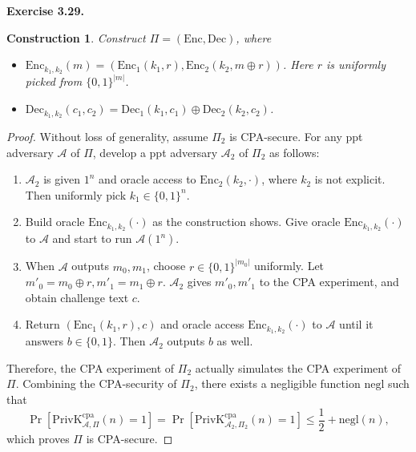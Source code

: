 \documentclass[a4paper]{article}
\newtheorem{construction}{Construction}
\newtheorem*{proof}{Proof}
\newenvironment{exercise}[1]{
	\par
	\noindent\textbf{Exercise #1.}\quad
}{
	\par
	\bigskip
}
\newcommand{\sbra}[1]{\left[ #1 \right]}
\newcommand{\bin}{\{0,1\}}
\newcommand{\Enc}{\mathrm{Enc}}
\newcommand{\Dec}{\mathrm{Dec}}
\newcommand{\PrivK}{\mathrm{PrivK}}
\newcommand{\negl}{\mathrm{negl}}
\newcommand{\ppt}{{\sc ppt} }
\newcommand{\cpa}{\mathrm{cpa}}
\begin{document}
\begin{exercise}{3.29}
\begin{construction}
    Construct $\Pi=(\Enc,\Dec)$, where
    \begin{itemize}
        \item $\Enc_{k_1,k_2}(m)=(\Enc_1(k_1,r),\Enc_2(k_2,m\oplus r))$. Here $r$ is uniformly picked from $\bin^{|m|}$.
        \item $\Dec_{k_1,k_2}(c_1,c_2)=\Dec_1(k_1,c_1)\oplus\Dec_2(k_2,c_2)$.
    \end{itemize}
\end{construction}
\begin{proof}
    Without loss of generality, assume $\Pi_2$ is CPA-secure. For any \ppt adversary $\mathcal A$ of $\Pi$, develop
    a \ppt adversary $\mathcal A_2$ of $\Pi_2$ as follows:
    \begin{enumerate}
        \item $\mathcal A_2$ is given $1^n$ and oracle access to $\Enc_2(k_2,\cdot)$, where $k_2$ is not explicit. 
            Then uniformly pick $k_1\in\{0,1\}^n$.
        \item Build oracle $\Enc_{k_1,k_2}(\cdot)$ as the construction shows. 
            Give oracle $\Enc_{k_1,k_2}(\cdot)$ to $\mathcal A$ and start to run $\mathcal A(1^n)$.
        \item When $\mathcal A$ outputs $m_0,m_1$, choose $r\in\bin^{|m_0|}$ uniformly.
            Let $m'_0=m_0\oplus r,m'_1=m_1\oplus r$. $\mathcal A_2$ gives $m'_0,m'_1$ to the CPA experiment, and obtain
            challenge text $c$.
        \item Return $(\Enc_1(k_1,r),c)$ and oracle access $\Enc_{k_1,k_2}(\cdot)$ to $\mathcal A$ until it
            answers $b\in\{0,1\}$. Then $\mathcal A_2$ outputs $b$ as well.
    \end{enumerate}
    Therefore, the CPA experiment of $\Pi_2$ actually simulates the CPA experiment of $\Pi$.
    Combining the CPA-security of $\Pi_2$, there exists a negligible function $\negl$ such that
    $$
        \Pr\sbra{\PrivK_{\mathcal A,\Pi}^\cpa(n)=1}=\Pr\sbra{\PrivK_{\mathcal A_2,\Pi_2}^\cpa(n)=1}\leq\frac12+\negl(n),
    $$
    which proves $\Pi$ is CPA-secure.
\end{proof}
\end{exercise}

\newpage
\end{document}
